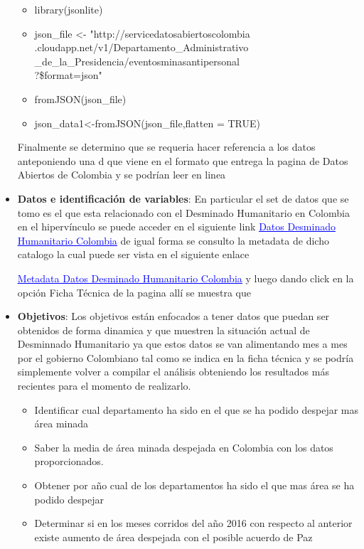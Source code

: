 \begin{itemize}
       \begin{itemize}
       	\item library(jsonlite)
       	\item json\_file \textless- "http://servicedatosabiertoscolombia\\
       	.cloudapp.net/v1/Departamento\_Administrativo\\
       	\_de\_la\_Presidencia/eventosminasantipersonal\\
       	?\$format=json"
       	\item fromJSON(json\_file)
      	\item json\_data1\textless-fromJSON(json\_file,flatten = TRUE)
      \end{itemize}
   Finalmente se determino que se requeria hacer referencia a los datos anteponiendo una d que viene en el formato que entrega la pagina de Datos Abiertos de Colombia y se podrían leer en linea
   \item \textbf{Datos e identificación de variables}: En particular el set de datos que se tomo es el que esta relacionado con el Desminado Humanitario en Colombia en el hipervínculo se puede acceder en el siguiente link
\href{http://servicedatosabiertoscolombia.cloudapp.net/v1/Departamento_Administrativo_de_la_Presidencia/situaciondesminadohumanitario}{\textcolor{blue}{\underline{Datos Desminado Humanitario Colombia}}}
de igual forma se consulto la metadata de dicho catalogo la cual puede ser vista en el siguiente enlace

\href{http://www.datos.gov.co/frm/catalogo/frmCatalogo.aspx?dsId=75158}{\textcolor{blue}{\underline{Metadata Datos Desminado Humanitario Colombia}}} y luego dando click en la opción Ficha Técnica de la pagina allí se muestra que 



   \item \textbf{Objetivos}: Los objetivos están enfocados a tener datos que puedan ser obtenidos de forma dinamica y que muestren la situación actual de Desminnado Humanitario ya que estos datos se van alimentando mes a mes por el gobierno Colombiano tal como se indica en la ficha técnica y se podría simplemente volver a compilar  el análisis obteniendo los resultados más recientes para el momento de realizarlo. 
    \begin{itemize}
     \item Identificar cual departamento ha sido en el que se ha podido despejar mas área minada
     \item Saber la media de área minada despejada en Colombia con los datos proporcionados.
     \item Obtener por año cual de los departamentos ha sido el que mas área se ha podido despejar
     \item Determinar si en los meses corridos del año 2016 con respecto al anterior existe aumento de área despejada con el posible acuerdo de Paz 

    \end{itemize}
  \end{itemize}



